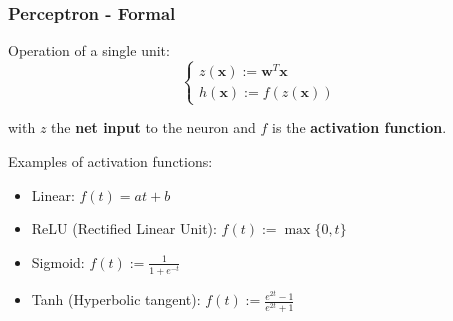 \documentclass{beamer}
\begin{document}

	

	\begin{frame}
		\frametitle{Perceptron - Formal}

		Operation of a single unit:
		\begin{equation*}
			\begin{cases}
				z(\bm{x}) := \bm{w}^T \bm{x}\\
				h(\bm{x}) := f(z(\bm{x}))
			\end{cases}
		\end{equation*}
	
		with $z$  the \textbf{net input} to the neuron and $f$ is the \textbf{activation function}. 
		
		\vspace{5mm}
		
		Examples of activation functions:
		\begin{itemize}
			\item Linear:  $f(t) = at + b$
			\item ReLU (Rectified Linear Unit): $f(t) := \max\{0, t\}$
			\item Sigmoid: $f(t) := \frac{1}{1 + e^{-t}}$
			\item Tanh (Hyperbolic tangent): $f(t) := \frac{e^{2t}-1}{e^{2t}+1}$
		\end{itemize}
		
	\end{frame}
	
\end{document}
